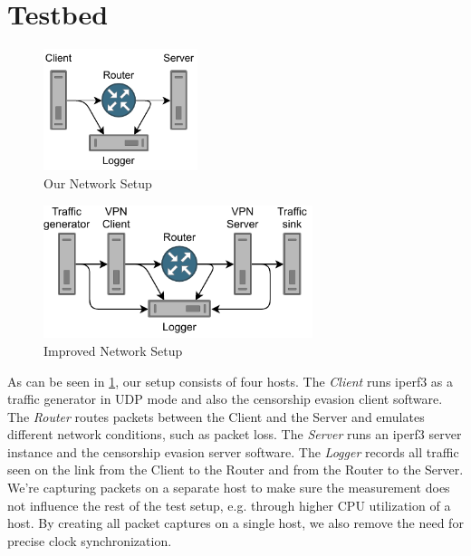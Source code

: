 \section{Testbed}
\begin{figure}[tbh]
	\centering
	\includegraphics[draft=false,width=0.4\textwidth]{figures/Network schematic/actual/setup.pdf}
	\caption{Our Network Setup}
	\label{fig:actual_network_schematic}
\end{figure}
\begin{figure}[tbh]
	\centering
	\includegraphics[draft=false,width=0.7\textwidth]{figures/Network schematic/optimal/setup.pdf}
	\caption{Improved Network Setup}
	\label{fig:optimal_network_schematic}
\end{figure}

As can be seen in \cref{fig:actual_network_schematic}, our setup consists of four hosts.
The \textit{Client} runs iperf3 as a traffic generator in UDP mode and also the censorship evasion client software.
The \textit{Router} routes packets between the Client and the Server and emulates different network conditions, such as packet loss.
The \textit{Server} runs an iperf3 server instance and the censorship evasion server software.
The \textit{Logger} records all traffic seen on the link from the Client to the Router and from the Router to the Server.
We're capturing packets on a separate host to make sure the measurement does not influence the rest of the test setup, e.g. through higher CPU utilization of a host.
By creating all packet captures on a single host, we also remove the need for precise clock synchronization.

